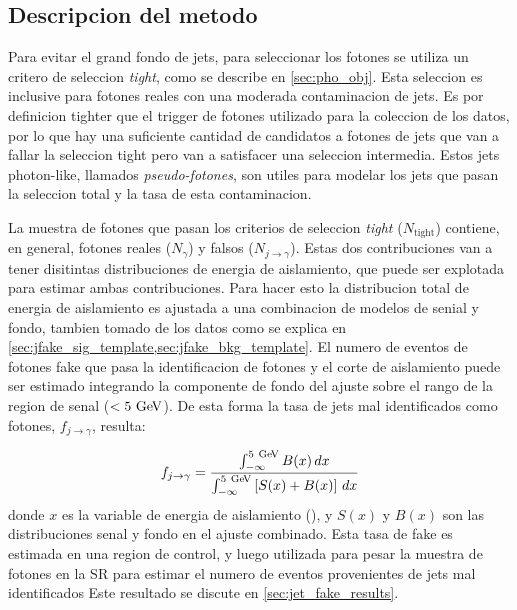\subsection{Descripcion del metodo}\label{sec:jetfake_method}

Para evitar el grand fondo de jets, para seleccionar los fotones se utiliza un
critero de seleccion \emph{tight}, como se describe en \cref{sec:pho_obj}.
Esta seleccion es inclusive para fotones reales con una moderada contaminacion
de jets. Es por definicion tighter que el trigger de fotones utilizado para
la coleccion de los datos, por lo que hay una suficiente cantidad de candidatos
a fotones de jets que van a fallar la seleccion tight pero van a satisfacer una
seleccion intermedia. Estos jets photon-like, llamados \emph{pseudo-fotones},
son utiles para modelar los jets que pasan la seleccion total y la tasa de esta
contaminacion.

La muestra de fotones que pasan los criterios de seleccion \emph{tight} ($N_\text{tight}$)
contiene, en general, fotones reales ($N_{\gamma}$) y falsos ($N_{j\to\gamma}$).
Estas dos contribuciones van a tener disitintas distribuciones de energia de aislamiento,
que puede ser explotada para estimar ambas contribuciones. Para hacer esto la distribucion
total de energia de aislamiento es ajustada a una combinacion de modelos de senial y fondo,
tambien tomado de los datos como se explica en \cref{sec:jfake_sig_template,sec:jfake_bkg_template}.
El numero de eventos de fotones fake que pasa la identificacion de fotones y el corte de
aislamiento puede ser estimado integrando la componente de fondo del ajuste sobre el rango
de la region de senal ($<5\GeV$). De esta forma la tasa de jets mal identificados como fotones,
$f_{j\to \gamma}$, resulta:

\begin{equation}\label{eq:jfake_formula}
    f_{j\to \gamma} = \frac{\int_{-\infty}^{5\gev} B(x)\, dx}{\int_{-\infty}^{5\gev} \left[S(x)+B(x)\right]\, dx}
\end{equation}
%
donde $x$ es la variable de energia de aislamiento (\etiso), y $S(x)$ y $B(x)$
son las distribuciones senal y fondo en el ajuste combinado.
Esta tasa de fake es estimada en una region de control, y luego utilizada para pesar la muestra
de fotones en la SR para estimar el numero de eventos provenientes de jets mal identificados Este
resultado se discute en \cref{sec:jet_fake_results}.

